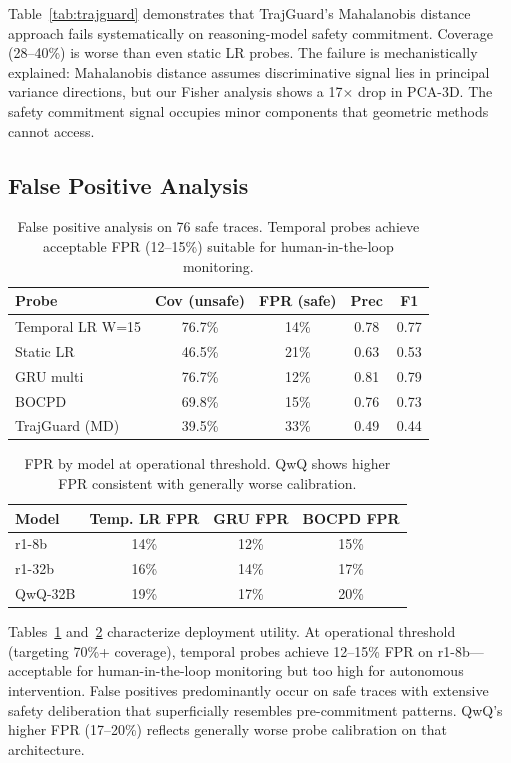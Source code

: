 \documentclass[11pt,a4paper]{article}
\begin{document}
Table~\ref{tab:trajguard} demonstrates that TrajGuard's Mahalanobis distance approach fails systematically on reasoning-model safety commitment. Coverage (28--40\%) is worse than even static LR probes. The failure is mechanistically explained: Mahalanobis distance assumes discriminative signal lies in principal variance directions, but our Fisher analysis shows a 17$\times$ drop in PCA-3D. The safety commitment signal occupies minor components that geometric methods cannot access.

\subsection{False Positive Analysis}
\label{sec:fpr}

\begin{table}[t]
\centering
\small
\begin{tabular}{lcccc}
\toprule
Probe & Cov (unsafe) & FPR (safe) & Prec & F1 \\
\midrule
Temporal LR W=15 & 76.7\% & 14\% & 0.78 & 0.77 \\
Static LR & 46.5\% & 21\% & 0.63 & 0.53 \\
GRU multi & 76.7\% & 12\% & 0.81 & 0.79 \\
BOCPD & 69.8\% & 15\% & 0.76 & 0.73 \\
TrajGuard (MD) & 39.5\% & 33\% & 0.49 & 0.44 \\
\bottomrule
\end{tabular}
\caption{False positive analysis on 76 safe traces. Temporal probes achieve acceptable FPR (12--15\%) suitable for human-in-the-loop monitoring.}
\label{tab:fpr}
\end{table}

\begin{table}[t]
\centering
\small
\begin{tabular}{lccc}
\toprule
Model & Temp. LR FPR & GRU FPR & BOCPD FPR \\
\midrule
r1-8b & 14\% & 12\% & 15\% \\
r1-32b & 16\% & 14\% & 17\% \\
QwQ-32B & 19\% & 17\% & 20\% \\
\bottomrule
\end{tabular}
\caption{FPR by model at operational threshold. QwQ shows higher FPR consistent with generally worse calibration.}
\label{tab:fpr_model}
\end{table}

Tables~\ref{tab:fpr} and~\ref{tab:fpr_model} characterize deployment utility. At operational threshold (targeting 70\%+ coverage), temporal probes achieve 12--15\% FPR on r1-8b---acceptable for human-in-the-loop monitoring but too high for autonomous intervention. False positives predominantly occur on safe traces with extensive safety deliberation that superficially resembles pre-commitment patterns. QwQ's higher FPR (17--20\%) reflects generally worse probe calibration on that architecture.
\end{document}
